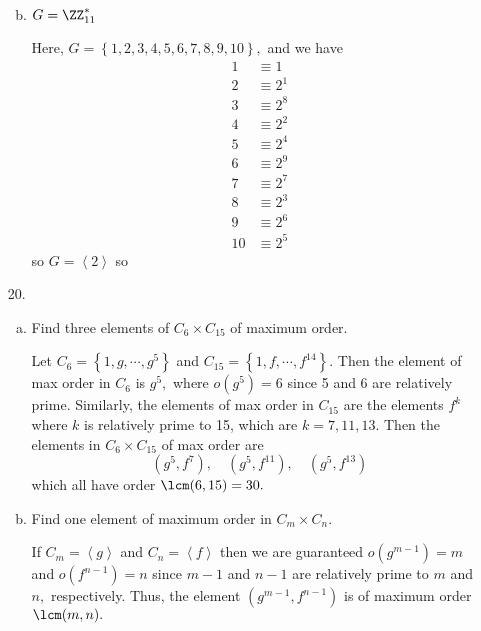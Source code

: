 \documentclass{article}
\begin{document}
\begin{itemize}
\begin{enumerate}[(a)]
\begin{soln}
				\end{soln}

				\newpage
			\item $G=\ZZ_{11}^*$
				\begin{soln}
					Here, $G=\left\{ 1, 2, 3, 4, 5, 6, 7, 8, 9, 10 \right\},$ and we have
					\begin{align*}
						1 &\equiv 1 \\
						2 &\equiv 2^1 \\
						3 &\equiv 2^8 \\
						4 &\equiv 2^2 \\
						5 &\equiv 2^4 \\
						6 &\equiv 2^9 \\
						7 &\equiv 2^7 \\
						8 &\equiv 2^3 \\
						9 &\equiv 2^6 \\
						10 &\equiv 2^5
					\end{align*} so $G=\left< 2\right>$ so 

				\end{soln}
				
		\end{enumerate}

	\item[20.] \begin{enumerate}[(a)]
			\item Find three elements of $C_6\times C_{15}$ of maximum order.
				\begin{soln}
					Let $C_6=\left\{ 1, g, \cdots, g^5 \right\}$ and $C_{15}=\left\{ 1, f, \cdots, f^{14} \right\}.$ Then the element of max order in $C_6$ is $g^5,$ where $o(g^5)=6$ since 5 and 6 are relatively prime. Similarly, the elements of max order in $C_{15}$ are the elements $f^k$ where $k$ is relatively prime to 15, which are $k=7, 11, 13.$ Then the elements in $C_6\times C_{15}$ of max order are \[\boxed{(g^5, f^7), \quad (g^5, f^{11}), \quad (g^5, f^{13})}\] which all have order $\lcm(6, 15)=30.$
					
				\end{soln}

			\item Find one element of maximum order in $C_m\times C_n.$
				\begin{soln}
					If $C_m=\left< g\right>$ and $C_n=\left< f\right>$ then we are guaranteed $o(g^{m-1})=m$ and $o(f^{n-1})=n$ since $m-1$ and $n-1$ are relatively prime to $m$ and $n,$ respectively. Thus, the element $\boxed{(g^{m-1}, f^{n-1})}$ is of maximum order $\lcm(m, n).$
					

\end{soln}
\end{enumerate}
\end{itemize}
\end{document}
